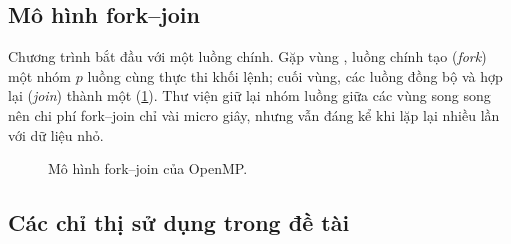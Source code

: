 \subsection{Mô hình fork--join}

Chương trình bắt đầu với một luồng chính. Gặp vùng , luồng chính tạo (\emph{fork})
một nhóm \(p\) luồng cùng thực thi khối lệnh; cuối vùng, các luồng đồng bộ và hợp lại
(\emph{join}) thành một (\cref{fig:forkjoin}). Thư viện  giữ lại nhóm luồng giữa
các vùng song song nên chi phí fork--join chỉ vài micro giây, nhưng vẫn đáng kể khi lặp lại nhiều
lần với dữ liệu nhỏ.

\begin{figure}[H]
\centering
{}
\caption{Mô hình fork--join của OpenMP.}
\label{fig:forkjoin}
\end{figure}

\subsection{Các chỉ thị sử dụng trong đề tài}

